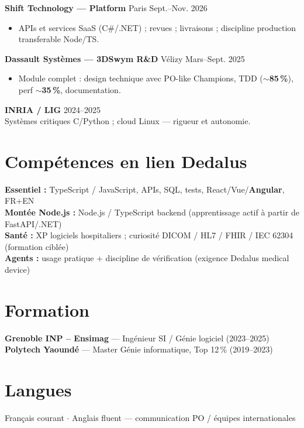 \documentclass[10pt,a4paper]{article}
\begin{document}
\textbf{Shift Technology --- Platform} \hfill Paris \hfill Sept.--Nov. 2026
\begin{itemize}
  \item APIs et services SaaS (C\#/.NET) ; revues ; livraisons ; discipline production transferable Node/TS.
\end{itemize}

\textbf{Dassault Syst\`emes --- 3DSwym R\&D} \hfill V\'elizy \hfill Mars--Sept. 2025
\begin{itemize}
  \item Module complet : design technique avec PO-like Champions, TDD ($\sim$\textbf{85\,\%}), perf $\sim$\textbf{35\,\%}, documentation.
\end{itemize}

\textbf{INRIA / LIG} \hfill 2024--2025\\
Syst\`emes critiques C/Python ; cloud Linux --- rigueur et autonomie.

\section{Comp\'etences en lien Dedalus}
\textbf{Essentiel :} TypeScript / JavaScript, APIs, SQL, tests, React/Vue/\textbf{Angular}, FR+EN\\
\textbf{Mont\'ee Node.js :} Node.js / TypeScript backend (apprentissage actif \`a partir de FastAPI/.NET)\\
\textbf{Sant\'e :} XP logiciels hospitaliers ; curiosit\'e DICOM / HL7 / FHIR / IEC 62304 (formation cibl\'ee)\\
\textbf{Agents :} usage pratique + discipline de v\'erification (exigence Dedalus medical device)

\section{Formation}
\textbf{Grenoble INP -- Ensimag} --- Ing\'enieur SI / G\'enie logiciel (2023--2025)\\
\textbf{Polytech Yaound\'e} --- Master G\'enie informatique, Top 12\,\% (2019--2023)

\section{Langues}
Fran\c{c}ais courant $\cdot$ Anglais fluent --- communication PO / \'equipes internationales
\end{document}
